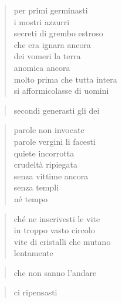 \clearpage


\vspace*{2cm}

	\begin{verse}
		per primi germinasti\\
		i mostri azzurri\\
		secreti di grembo estroso\\
		che era ignara ancora\\
		dei vomeri la terra\\
		anomica ancora\\
		molto prima che tutta intera\\
		si afformicolasse di uomini
	\end{verse}

\clearpage


\vspace*{2cm}

	\begin{verse}
		secondi generasti gli dei
	\end{verse}

	\begin{verse}
		parole non invocate\\
		parole vergini li facesti\\
		quiete incorrotta\\
		crudeltà ripiegata\\
		senza vittime ancora\\
		senza templi\\
		né tempo
	\end{verse}

	\begin{verse}
		ché ne inscrivesti le vite\\
		in troppo vasto circolo\\
		vite di cristalli che mutano\\
		lentamente
	\end{verse}

	\begin{verse}
		che non sanno l’andare
	\end{verse}

\clearpage


\vspace*{2cm}

	\begin{verse}
		ci ripensasti
	\end{verse}

